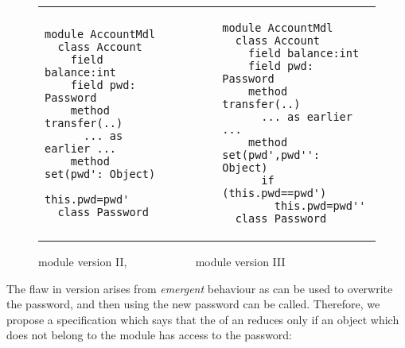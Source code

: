 %
  
  
 \begin{figure}[hbtp]
 \begin{tabular}{lll}
\begin{minipage}{0.35\textwidth}
\begin{lstlisting}[language=chainmail]
module AccountMdl
  class Account
    field balance:int 
    field pwd: Password 
    method transfer(..) 
      ... as earlier ...
    method set(pwd': Object)
      this.pwd=pwd'
  class Password 
\end{lstlisting}
\end{minipage}
  &\ \ \  \ \   &
\begin{minipage}{0.50\textwidth}
\begin{lstlisting}[language=chainmail]
module AccountMdl
  class Account
    field balance:int 
    field pwd: Password 
    method transfer(..) 
      ... as earlier ...
    method set(pwd',pwd'': Object)
      if (this.pwd==pwd') 
        this.pwd=pwd''
  class Password
\end{lstlisting}
\end{minipage} 
 \end{tabular}
  \caption{module  version II,  \ \ \ \ \ \hspace{.7in} \ \ \ \ \ \  module  version III}
 \label{fig:ExampleAccount}
 \end{figure}

 
 The flaw in version {} arises from \emph{emergent} behaviour as  
 can be used to overwrite the
 password, and then using the new password   can be called.
 Therefore, we propose a %
 specification which says that
 the  of an  reduces only if an object which does not belong to the
 module has access to the password:
 
